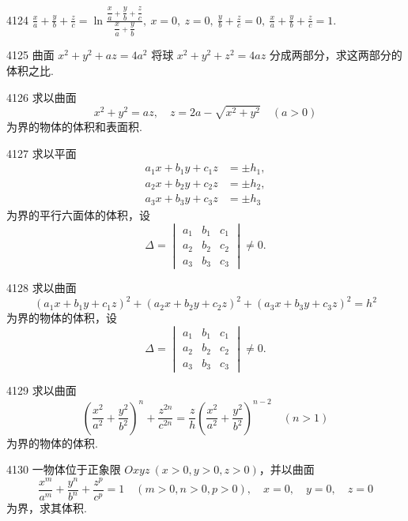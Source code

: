 \begin{prob}[S]{4124}
$\displaystyle \frac{x}{a}+\frac{y}{b}+\frac{z}{c} = \ln \frac{\dfrac{x}{a}+\dfrac{y}{b}+\dfrac{z}{c}}{\dfrac{x}{a}+\dfrac{y}{b}},\ x=0,\ z=0,\ \frac{y}{b}+\frac{z}{c}=0,\ \frac{x}{a}+\frac{y}{b}+\frac{z}{c}=1$.
\end{prob}

\begin{prob}[M]{4125}
曲面 $x^2+y^2+az=4a^2$ 将球 $x^2+y^2+z^2=4az$ 分成两部分，求这两部分的体积之比.
\end{prob}

\begin{prob}[M]{4126}
求以曲面
\[
x^2+y^2=az,\quad z=2a-\sqrt{x^2+y^2} \quad (a>0)
\]
为界的物体的体积和表面积.
\end{prob}

\begin{prob}[M]{4127}
求以平面
\[
\begin{aligned}
a_1 x + b_1 y + c_1 z &= \pm h_1, \\
a_2 x + b_2 y + c_2 z &= \pm h_2, \\
a_3 x + b_3 y + c_3 z &= \pm h_3
\end{aligned}
\]
为界的平行六面体的体积，设
\[
\Delta = \begin{vmatrix}
a_1 & b_1 & c_1 \\
a_2 & b_2 & c_2 \\
a_3 & b_3 & c_3
\end{vmatrix} \neq 0.
\]
\end{prob}

\begin{prob}[M]{4128}
求以曲面
\[
(a_1 x + b_1 y + c_1 z)^2 + (a_2 x + b_2 y + c_2 z)^2 + (a_3 x + b_3 y + c_3 z)^2 = h^2
\]
为界的物体的体积，设
\[
\Delta = \begin{vmatrix}
a_1 & b_1 & c_1 \\
a_2 & b_2 & c_2 \\
a_3 & b_3 & c_3
\end{vmatrix} \neq 0.
\]
\end{prob}

\begin{prob}[M]{4129}
求以曲面
\[
\left(\frac{x^2}{a^2}+\frac{y^2}{b^2}\right)^n + \frac{z^{2n}}{c^{2n}} = \frac{z}{h} \left(\frac{x^2}{a^2}+\frac{y^2}{b^2}\right)^{n-2} \quad (n>1)
\]
为界的物体的体积.
\end{prob}

\begin{prob}[M]{4130}
一物体位于正象限 $Oxyz\ (x>0, y>0, z>0)$，并以曲面
\[
\frac{x^m}{a^m} + \frac{y^n}{b^n} + \frac{z^p}{c^p} = 1 \quad (m>0, n>0, p>0),\quad x=0,\quad y=0,\quad z=0
\]
为界，求其体积.
\end{prob}


